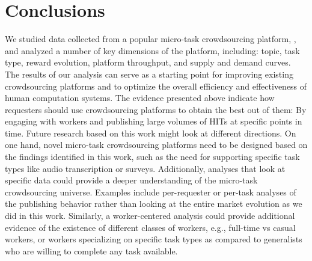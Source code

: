 \section{Conclusions}\label{sec:conc}
We studied data collected from a popular micro-task crowdsourcing platform, \amt{},
and analyzed a number of key dimensions of the platform, including: topic, task type, reward evolution, platform throughput, and supply and demand curves. The results of our analysis can serve as a starting point for improving existing crowdsourcing platforms and to optimize the overall efficiency and effectiveness of human computation systems. The evidence presented above indicate how requesters should use crowdsourcing platforms to obtain the best out of them: By engaging with workers and publishing large volumes of HITs at specific points in time. 
Future research based on this work might look at different directions. On one hand, novel micro-task crowdsourcing platforms need to be designed based on the findings identified in this work, such as the need for supporting specific task types like audio transcription or surveys. 
Additionally, analyses that look at specific data could provide a deeper understanding of the micro-task crowdsourcing universe. Examples include per-requester or per-task analyses of the publishing behavior rather than looking at the entire market evolution as we did in this work.
Similarly, a worker-centered analysis could provide additional evidence of the existence of different classes of workers, e.g., full-time vs casual workers, or workers specializing on specific task types as compared to generalists who are willing to complete any task available.